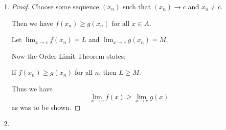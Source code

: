 \documentclass[12pt,letterpaper]{article}
\begin{document}
\begin{enumerate}[label=Exercise 4.2.\arabic*]
\begin{enumerate}
        \item
          Let $f : A \to R$.

          We say that $\lim_{x \to \infty} f(x) = \infty$ provided that,
          for all arbitrarily large $\epsilon$,
          there exists an arbitrarily large $\delta$
          such that whenever $x > \delta$ (and $x \in A$) it follows that $f(x) > \epsilon$.

          An example of such a limit is

          \[
            \lim_{x \to \infty} x = \infty
          \]

          \begin{proof}
            We have $f(x) = x$.

            Given an arbitrarily large $\epsilon$,
            we want to find an arbitrarily large $\delta$ such that

            \[
              x > \delta \implies x > \epsilon
            \].

            So, choose $\delta = \epsilon$.

            Then we have
            \[
              x > \delta \implies x > \epsilon
            \]
            as was to be shown.

          \end{proof}

      \end{enumerate}

    \item

      \begin{proof}

        Choose some sequence $(x_n)$ such that $(x_n) \to c$ and $x_n \ne c$.

        Then we have $f(x_n) \ge g(x_n)$ for all $x \in A$.

        Let $\lim_{x \to c} f(x_n) = L$ and $\lim_{x \to c} g(x_n) = M$.

        Now the Order Limit Theorem states:

        If $f(x_n) \ge g(x_n)$ for all $n$, then $L \ge M$.

        Thus we have
        \[
          \lim_{x \to c} f(x) \ge \lim_{x \to c} g(x)
        \]
        as was to be shown.
      \end{proof}

    \item

  \end{enumerate}
\end{document}
